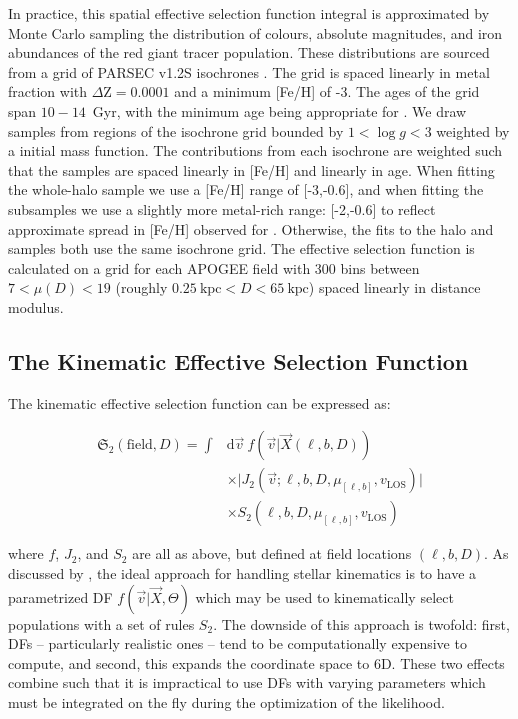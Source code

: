 In practice, this spatial effective selection function integral is approximated by Monte Carlo sampling the distribution of colours, absolute magnitudes, and iron abundances of the red giant tracer population. These distributions are sourced from a grid of PARSEC v1.2S isochrones \parencite{bressan12}. The grid is spaced linearly in metal fraction with $\Delta \mathrm{Z} = 0.0001$ and a minimum [Fe/H] of -3. The ages of the grid span $10-14$~Gyr, with the minimum age being appropriate for \gse \parencite{montalban21}. We draw samples from regions of the isochrone grid bounded by $1 < \log g < 3$ weighted by a \textcite{chabrier03} initial mass function. The contributions from each isochrone are weighted such that the samples are spaced linearly in [Fe/H] and linearly in age. When fitting the whole-halo sample we use a [Fe/H] range of [-3,-0.6], and when fitting the \gse subsamples we use a slightly more metal-rich range: [-2,-0.6] to reflect approximate spread in [Fe/H] observed for \gse \parencite[see our Figure~\ref{ch3:fig:selection_abundances} or refer to e.g.][]{myeong19,hasselquist21,horta23a}. Otherwise, the fits to the halo and \gse samples both use the same isochrone grid. The effective selection function is calculated on a grid for each APOGEE field with 300 bins between $7 < \mu(D) < 19$ (roughly $0.25~\mathrm{kpc} < D < 65~\mathrm{kpc}$) spaced linearly in distance modulus.

\subsection{The Kinematic Effective Selection Function}
\label{ch3:subsec:kinematic-effective-selection-function}

The kinematic effective selection function can be expressed as:

\begin{equation}
\label{ch3:eq:kinematic-effective-selection-function}
\begin{split}
    \mathfrak{S}_{2}(\mathrm{field},D) = \int & \mathrm{d} \vec{v}\ f(\vec{v} \vert \vec{X}(\ell, b, D)) \\
    & \times \lvert J_{2}(\vec{v}; \ell, b, D, \mu_{[\ell,b]}, v_{\mathrm{LOS}}) \rvert \\
    & \times S_{2}(\ell, b, D, \mu_{[\ell,b]}, v_{\mathrm{LOS}})
\end{split}
\end{equation}

where $f$, $J_{2}$, and $S_{2}$ are all as above, but defined at field locations $(\ell,b,D)$. As discussed by \cite{mackereth20}, the ideal approach for handling stellar kinematics is to have a parametrized DF $f(\vec{v} \vert \vec{X}, \Theta)$ which may be used to kinematically select populations with a set of rules $S_{2}$. The downside of this approach is twofold: first, DFs -- particularly realistic ones -- tend to be computationally expensive to compute, and second, this expands the coordinate space to 6D. These two effects combine such that it is impractical to use DFs with varying parameters which must be integrated on the fly during the optimization of the likelihood.

